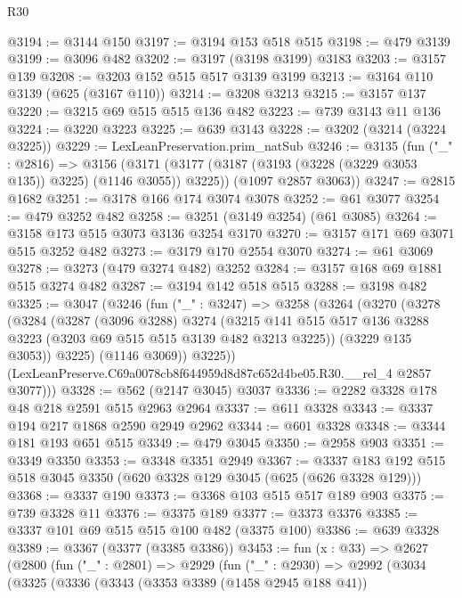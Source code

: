 \begin{lexlean}{R30}
\begin{coremodule}
@3194 := @3144 @150
@3197 := @3194 @153 @518 @515
@3198 := @479 @3139
@3199 := @3096 @482
@3202 := @3197 (@3198 @3199) @3183
@3203 := @3157 @139
@3208 := @3203 @152 @515 @517 @3139 @3199
@3213 := @3164 @110 @3139 (@625 (@3167 @110))
@3214 := @3208 @3213
@3215 := @3157 @137
@3220 := @3215 @69 @515 @515 @136 @482
@3223 := @739 @3143 @11 @136
@3224 := @3220 @3223
@3225 := @639 @3143
@3228 := @3202 (@3214 (@3224 @3225))
@3229 := LexLeanPreservation.prim_natSub
@3246 := @3135
    (fun ("_" : @2816) =>
    @3156
      (@3171 (@3177 (@3187 (@3193 (@3228 (@3229 @3053 @135)) @3225) (@1146 @3055)) @3225))
      (@1097 @2857 @3063))
@3247 := @2815 @1682
@3251 := @3178 @166 @174 @3074 @3078
@3252 := @61 @3077
@3254 := @479 @3252 @482
@3258 := @3251 (@3149 @3254) (@61 @3085)
@3264 := @3158 @173 @515 @3073 @3136 @3254 @3170
@3270 := @3157 @171 @69 @3071 @515 @3252 @482
@3273 := @3179 @170 @2554 @3070
@3274 := @61 @3069
@3278 := @3273 (@479 @3274 @482) @3252
@3284 := @3157 @168 @69 @1881 @515 @3274 @482
@3287 := @3194 @142 @518 @515
@3288 := @3198 @482
@3325 := @3047
    (@3246
      (fun ("_" : @3247) =>
      @3258
        (@3264
          (@3270
            (@3278
              (@3284
                (@3287
                  (@3096 @3288)
                  @3274
                  (@3215
                    @141
                    @515
                    @517
                    @136
                    @3288
                    @3223
                    (@3203 @69 @515 @515 @3139 @482 @3213 @3225))
                  (@3229 @135 @3053))
                @3225)
              (@1146 @3069))
            @3225))
        (LexLeanPreserve.C69a0078cb8f644959d8d87c652d4be05.R30.__rel_4 @2857 @3077)))
@3328 := @562 (@2147 @3045) @3037
@3336 := @2282 @3328 @178 @48 @218 @2591 @515 @2963 @2964
@3337 := @611 @3328
@3343 := @3337 @194 @217 @1868 @2590 @2949 @2962
@3344 := @601 @3328
@3348 := @3344 @181 @193 @651 @515
@3349 := @479 @3045
@3350 := @2958 @903
@3351 := @3349 @3350
@3353 := @3348 @3351 @2949
@3367 := @3337 @183 @192 @515 @518 @3045 @3350 (@620 @3328 @129 @3045 (@625 (@626 @3328 @129)))
@3368 := @3337 @190
@3373 := @3368 @103 @515 @517 @189 @903
@3375 := @739 @3328 @11
@3376 := @3375 @189
@3377 := @3373 @3376
@3385 := @3337 @101 @69 @515 @515 @100 @482 (@3375 @100)
@3386 := @639 @3328
@3389 := @3367 (@3377 (@3385 @3386))
@3453 := fun (x : @33) =>
  @2627
    (@2800
      (fun ("_" : @2801) =>
      @2929
        (fun ("_" : @2930) =>
        @2992
          (@3034
            (@3325
              (@3336
                (@3343
                  (@3353 @3389 (@1458 @2945 @188 @41))

\end{coremodule}
\end{lexlean}
